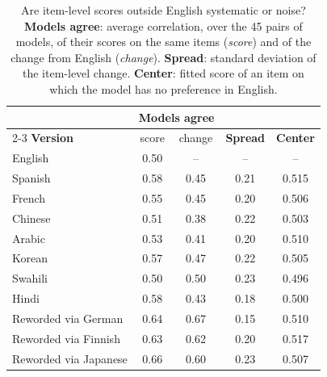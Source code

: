 \begin{table}[t]
\centering
\small
\setlength{\tabcolsep}{3.5pt}
\begin{tabular}{lcccc}
\toprule
 & \multicolumn{2}{c}{\textbf{Models agree}} & & \\
\cmidrule(lr){2-3}
\textbf{Version} & score & change & \textbf{Spread} & \textbf{Center} \\
\midrule
English & 0.50 & -- & -- & -- \\
\midrule
Spanish & 0.58 & 0.45 & 0.21 & 0.515 \\
French & 0.55 & 0.45 & 0.20 & 0.506 \\
Chinese & 0.51 & 0.38 & 0.22 & 0.503 \\
Arabic & 0.53 & 0.41 & 0.20 & 0.510 \\
Korean & 0.57 & 0.47 & 0.22 & 0.505 \\
Swahili & 0.50 & 0.50 & 0.23 & 0.496 \\
Hindi & 0.58 & 0.43 & 0.18 & 0.500 \\
\midrule
Reworded via German & 0.64 & 0.67 & 0.15 & 0.510 \\
Reworded via Finnish & 0.63 & 0.62 & 0.20 & 0.517 \\
Reworded via Japanese & 0.66 & 0.60 & 0.23 & 0.507 \\
\bottomrule
\end{tabular}
\caption{Are item-level scores outside English systematic or noise? \textbf{Models agree}: average correlation, over the 45 pairs of models, of their scores on the same items (\emph{score}) and of the change from English (\emph{change}). \textbf{Spread}: standard deviation of the item-level change. \textbf{Center}: fitted score of an item on which the model has no preference in English.}
\label{tab:agreement}
\end{table}
